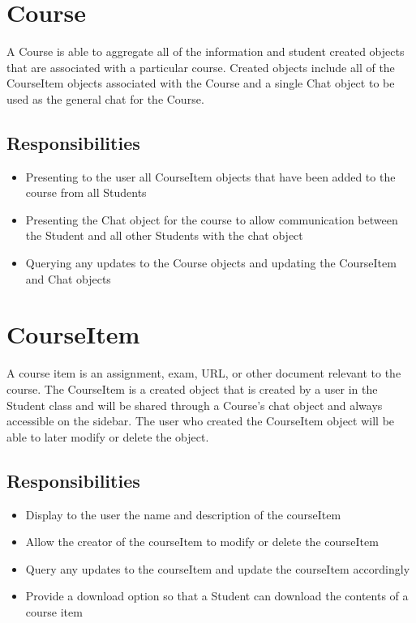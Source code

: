 \documentclass{scrreprt}
\begin{document}
\section{Course}
A Course is able to aggregate all of the information and student created objects that are associated with a particular course. Created objects include all of the CourseItem objects associated with the Course and a single Chat object to be used as the general chat for the Course.
\subsection{Responsibilities}
\begin{itemize}
	\item Presenting to the user all CourseItem objects that have been added to the course from all Students 
	\item Presenting the Chat object for the course to allow communication between the Student and all other Students with the chat object
	\item Querying any updates to the Course objects and updating the CourseItem and Chat objects
\end{itemize}

\section{CourseItem}
A course item is an assignment, exam, URL, or other document relevant to the course. The CourseItem is a created object that is created by a user in the Student class and will be shared through a Course’s chat object and always accessible on the sidebar. The user who created the CourseItem object will be able to later modify or delete the object.
\subsection{Responsibilities}
\begin{itemize}
	\item Display to the user the name and description of the courseItem
	\item Allow the creator of the courseItem to modify or delete the courseItem
	\item Query any updates to the courseItem and update the courseItem accordingly
	\item Provide a download option so that a Student can download the contents of a course item
\end{itemize}
\end{document}
